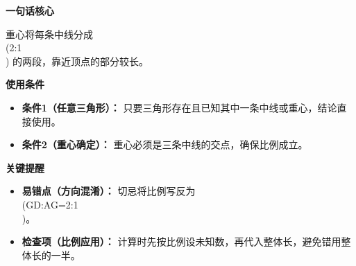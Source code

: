 \begin{summarybox}
	\textbf{\textcolor{CSummary}{一句话核心}}

	重心将每条中线分成 \\(2:1\\) 的两段，靠近顶点的部分较长。

	\medskip
	\textbf{\textcolor{CSummary}{使用条件}}
	\begin{itemize}[leftmargin=*, itemsep=0.5em, topsep=0.4em]
		\item \textbf{条件1（任意三角形）：} 只要三角形存在且已知其中一条中线或重心，结论直接使用。
		\item \textbf{条件2（重心确定）：} 重心必须是三条中线的交点，确保比例成立。
	\end{itemize}

	\medskip
	\textbf{\textcolor{CSummary}{关键提醒}}
	\begin{itemize}[leftmargin=*, itemsep=0.5em, topsep=0.4em]
		\item \textbf{易错点（方向混淆）：} 切忌将比例写反为 \\(GD:AG=2:1\\)。
		\item \textbf{检查项（比例应用）：} 计算时先按比例设未知数，再代入整体长，避免错用整体长的一半。
	\end{itemize}
\end{summarybox}
